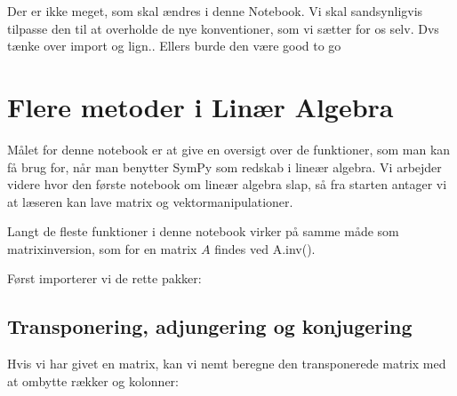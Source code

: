 \documentclass[letterpaper,10pt,english]{jupyterBook}
\begin{document}
\noindent{}

Der er ikke meget, som skal ændres i denne Notebook. Vi skal sandsynligvis tilpasse den til at overholde de nye konventioner, som vi sætter for os selv. Dvs tænke over import og lign.. Ellers burde den være good to go


\section{Flere metoder i Linær Algebra}
\label{\detokenize{notebooks/sympy/Notebook_LinAlg_2:flere-metoder-i-linaer-algebra}}\label{\detokenize{notebooks/sympy/Notebook_LinAlg_2::doc}}
Målet for denne notebook er at give en oversigt over de funktioner, som man kan få brug for, når man benytter SymPy som redskab i lineær algebra. Vi arbejder videre hvor den første notebook om lineær algebra slap, så fra starten antager vi at læseren kan lave matrix\sphinxhyphen{} og vektormanipulationer.

Langt de fleste funktioner i denne notebook virker på samme måde som matrixinversion, som for en matrix \(A\) findes ved A.inv().

Først importerer vi de rette pakker:

\begin{sphinxVerbatim}[commandchars=\\\{\}]
                 
              

          
           

   
\end{sphinxVerbatim}


\subsection{Transponering, adjungering og konjugering}
\label{\detokenize{notebooks/sympy/Notebook_LinAlg_2:transponering-adjungering-og-konjugering}}
Hvis vi har givet en matrix, kan vi nemt beregne den transponerede matrix med at ombytte rækker og kolonner:
\end{document}
